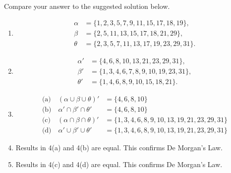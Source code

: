 Compare your answer to the suggested solution below.

\begin{enumerate}[start=2]
  \item
  \begin{align*}
    \alpha &= \{1, 2, 3, 5, 7, 9, 11, 15, 17, 18, 19\}, \\
    \beta &= \{2, 5, 11, 13, 15, 17, 18, 21, 29\}, \\
    \theta &= \{2, 3, 5, 7, 11, 13, 17, 19, 23, 29, 31\}.
  \end{align*}
  \item
  \begin{align*}
    \alpha' &= \{4, 6, 8, 10, 13, 21, 23, 29, 31\}, \\
    \beta' &= \{1, 3, 4, 6, 7, 8, 9, 10, 19, 23, 31\}, \\
    \theta' &= \{1, 4, 6, 8, 9, 10, 15, 18, 21\}.
  \end{align*}
  \item
  \begin{align*}
    \text{(a)}\quad (\alpha \cup \beta \cup \theta)' &= \{4, 6, 8, 10\} \\
    \text{(b)}\quad \alpha' \cap \beta' \cap \theta' &= \{4, 6, 8, 10\} \\
    \text{(c)}\quad (\alpha \cap \beta \cap \theta)' &= \{1, 3, 4, 6, 8, 9, 10, 13, 19, 21, 23, 29, 31\} \\
    \text{(d)}\quad \alpha' \cup \beta' \cup \theta' &= \{1, 3, 4, 6, 8, 9, 10, 13, 19, 21, 23, 29, 31\}
  \end{align*}
  \item Results in 4(a) and 4(b) are equal. This confirms De Morgan's Law.
  \item Results in 4(c) and 4(d) are equal. This confirms De Morgan's Law.
\end{enumerate}

